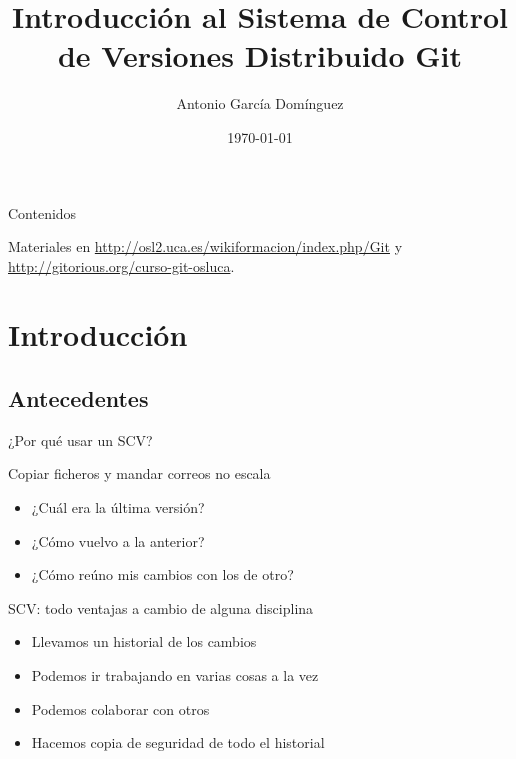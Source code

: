 \documentclass[xcolor=svgnames]{beamer}
\title[Introducción a Git]{Introducción al Sistema de Control de Versiones Distribuido Git}
\author{Antonio García Domínguez}
\date{\today}
\institute{Universidad de Cádiz \\\vspace{2em} \texttt{[image: ../cc-by-sa]}}
\begin{document}
\begin{frame}
  \titlepage
\end{frame}

\begin{frame}{Contenidos}
  \tableofcontents[hideallsubsections]

  Materiales en \url{http://osl2.uca.es/wikiformacion/index.php/Git} y
  \url{http://gitorious.org/curso-git-osluca}.
\end{frame}

\section{Introducción}

\subsection{Antecedentes}

\begin{frame}{¿Por qué usar un SCV?}

  \begin{block}{Copiar ficheros y mandar correos no escala}
    \begin{itemize}
    \item ¿Cuál era la última versión?
    \item ¿Cómo vuelvo a la anterior?
    \item ¿Cómo reúno mis cambios con los de otro?
    \end{itemize}
  \end{block}

  \begin{block}{SCV: todo ventajas a cambio de alguna disciplina}
    \begin{itemize}
    \item Llevamos un historial de los cambios
    \item Podemos ir trabajando en varias cosas a la vez
    \item Podemos colaborar con otros
    \item Hacemos copia de seguridad de todo el historial
    \end{itemize}
  \end{block}
\end{frame}
\end{document}
